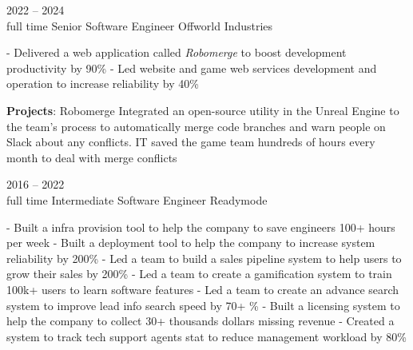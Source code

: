 \documentclass[9pt]{developercv} %
\begin{document}
\begin{entrylist}
	\entry
		{2022 -- 2024\\\footnotesize{full time}}
		{Senior Software Engineer}
		{Offworld Industries}
		{
            - Delivered a web application called \textit{Robomerge} to boost development productivity by 90\%\newline
            - Led website and game web services development and operation to increase reliability by 40\%\newline

            \textbf{Projects}: Robomerge\newline
            Integrated an open-source utility in the Unreal Engine to the team’s process to automatically merge code branches and warn people on Slack about any conflicts. IT saved the game team hundreds of hours every month to deal with merge conflicts\newline
        }
	\entry
		{2016 -- 2022\\\footnotesize{full time}}
		{Intermediate Software Engineer}
		{Readymode}
		{
            - Built a infra provision tool to help the company to save engineers 100+ hours per week\newline
            - Built a deployment tool to help the company to increase system reliability by 200\%\newline
            - Led a team to build a sales pipeline system to help users to grow their sales by 200\%\newline
            - Led a team to create a gamification system to train 100k+ users to learn software features\newline
            - Led a team to create an advance search system to improve lead info search speed by 70+ \%\newline
            - Built a licensing system to help the company to collect 30+ thousands dollars missing revenue\newline
            - Created a system to track tech support agents stat to reduce management workload by 80\%\newline

}
\end{entrylist}
\end{document}
